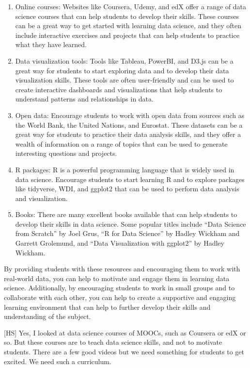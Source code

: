 \documentclass[
]{bxjsbook}
\providecommand{\tightlist}{%
  \setlength{\itemsep}{0pt}\setlength{\parskip}{0pt}}
\theoremstyle{definition}
\theoremstyle{definition}
\theoremstyle{definition}
\theoremstyle{definition}
\theoremstyle{remark}
\begin{document}
\begin{enumerate}
\def\labelenumi{\arabic{enumi}.}
\tightlist
\item
  Online courses: Websites like Coursera, Udemy, and edX offer a range of data science courses that can help students to develop their skills. These courses can be a great way to get started with learning data science, and they often include interactive exercises and projects that can help students to practice what they have learned.
\item
  Data visualization tools: Tools like Tableau, PowerBI, and D3.js can be a great way for students to start exploring data and to develop their data visualization skills. These tools are often user-friendly and can be used to create interactive dashboards and visualizations that help students to understand patterns and relationships in data.
\item
  Open data: Encourage students to work with open data from sources such as the World Bank, the United Nations, and Eurostat. These datasets can be a great way for students to practice their data analysis skills, and they offer a wealth of information on a range of topics that can be used to generate interesting questions and projects.
\item
  R packages: R is a powerful programming language that is widely used in data science. Encourage students to start learning R and to explore packages like tidyverse, WDI, and ggplot2 that can be used to perform data analysis and visualization.
\item
  Books: There are many excellent books available that can help students to develop their skills in data science. Some popular titles include ``Data Science from Scratch'' by Joel Grus, ``R for Data Science'' by Hadley Wickham and Garrett Grolemund, and ``Data Visualization with ggplot2'' by Hadley Wickham.
\end{enumerate}

By providing students with these resources and encouraging them to work with real-world data, you can help to motivate and engage them in learning data science. Additionally, by encouraging students to work in small groups and to collaborate with each other, you can help to create a supportive and engaging learning environment that can help to further develop their skills and understanding of the subject.

{[}HS{]} Yes, I looked at data science courses of MOOCs, such as Coursera or edX or so. But these courses are to teach data science skills, and not to motivate students. There are a few good videos but we need something for students to get excited. We need such a curriculum.
\end{document}
